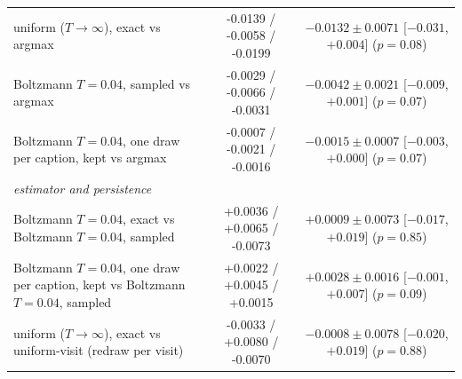 \documentclass[11pt,a4paper]{article}
\begin{document}
\begin{table}[ht]
{\begin{tabular}{l c c}
uniform ($T\to\infty$), exact vs argmax & -0.0139 / -0.0058 / -0.0199 & $-0.0132 \pm 0.0071$ [$-0.031$, $+0.004$] ($p=0.08$)  \\
Boltzmann $T{=}0.04$, sampled vs argmax & -0.0029 / -0.0066 / -0.0031 & $-0.0042 \pm 0.0021$ [$-0.009$, $+0.001$] ($p=0.07$)  \\
Boltzmann $T{=}0.04$, one draw per caption, kept vs argmax & -0.0007 / -0.0021 / -0.0016 & $-0.0015 \pm 0.0007$ [$-0.003$, $+0.000$] ($p=0.07$)  \\
\midrule
\multicolumn{3}{l}{\emph{estimator and persistence}} \\
Boltzmann $T{=}0.04$, exact vs Boltzmann $T{=}0.04$, sampled & +0.0036 / +0.0065 / -0.0073 & $+0.0009 \pm 0.0073$ [$-0.017$, $+0.019$] ($p=0.85$)  \\
Boltzmann $T{=}0.04$, one draw per caption, kept vs Boltzmann $T{=}0.04$, sampled & +0.0022 / +0.0045 / +0.0015 & $+0.0028 \pm 0.0016$ [$-0.001$, $+0.007$] ($p=0.09$)  \\
uniform ($T\to\infty$), exact vs uniform-visit (redraw per visit) & -0.0033 / +0.0080 / -0.0070 & $-0.0008 \pm 0.0078$ [$-0.020$, $+0.019$] ($p=0.88$)  \\
\bottomrule
\end{tabular}}
\end{table}
\end{document}
